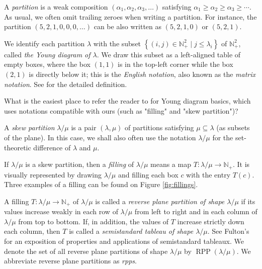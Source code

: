 \documentclass[12pt]{article}
\theoremstyle{plain}
\theoremstyle{definition}
\newenvironment{todo}{}{}
\newcommand{\Nplus}{\mathbb{N}_{+}}
\def\lm{{\lambda/\mu}}
\begin{document}
A \textit{partition} is a weak composition $\left(  \alpha_{1},\alpha
_{2},\alpha_{3},\ldots\right)  $ satisfying $\alpha_{1}\geq\alpha_{2}
\geq\alpha_{3}\geq\cdots$.
As usual, we often omit trailing zeroes when writing a partition. For instance, the partition $(5,2,1,0,0,0,\ldots)$ can be also written as $(5,2,1,0)$ or $(5,2,1)$.

We identify each partition $\lambda$ with the subset
$\left\{ \left( i, j \right) \in \Nplus^2 \mid j \leq \lambda_i \right\}$
of $\Nplus^{2}$, called \textit{the Young diagram of $\lambda$}.
We draw this subset as a left-aligned table of
empty boxes, where the box $(1,1)$ is in the top-left corner while the
box $(2,1)$ is directly below it; this is the \textit{English notation},
also known as the \textit{matrix notation}. See \cite{Fulton97} for the detailed definition.


\begin{todo}
What is the easiest place to refer the reader to for Young diagram basics,
which uses notations compatible with ours (such as "filling" and "skew
partition")?
\end{todo}

A \textit{skew partition} $\lambda/\mu$ is a pair $\left(\lambda, \mu\right)$ of partitions satisfying $\mu\subseteq\lambda$ (as subsets of the plane). In this case, we shall also often use the notation $\lambda/\mu$ for the set-theoretic difference of $\lambda$ and $\mu$.

 If $\lm$ is a skew partition, then a \textit{filling} of $\lm$ means a map $T:\lm\rightarrow\Nplus$. It is visually represented by drawing $\lm$ and filling each box $c$ with the entry $T(c)$. Three examples of a filling can be found on Figure \ref{fig:fillings}.
 

 A filling $T:\lm\rightarrow\Nplus$ of $\lm$ is called a \textit{reverse plane partition of shape $\lm$} if its values increase weakly in each row of $\lm$ from left to right and in each column of $\lm$ from top to bottom. If, in addition, the values of $T$ increase strictly down each column, then $T$ is called a \textit{semistandard tableau of shape $\lm$}. See Fulton's \cite{Fulton97} for an exposition of properties and applications of semistandard tableaux.
 We denote the set of all reverse plane partitions of shape $\lm$ by $\operatorname{RPP}\left(  \lambda/\mu\right)$.  We abbreviate reverse plane partitions as \textit{rpps}. 
 
\end{document}
